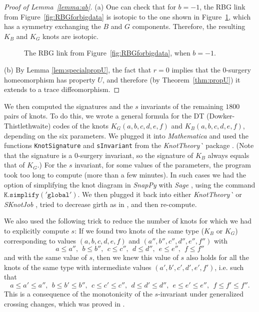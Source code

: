 \documentclass [11pt]{amsart}
\theoremstyle{remark}
\begin{document}
\begin{proof}[Proof of Lemma~\ref{lemma:ab}]
(a) One can check that for $b=-1$, the RBG link from Figure~\ref{fig:RBGforbigdata} is isotopic to the one shown in Figure~\ref{fig:bminus1}, which has a symmetry exchanging the $B$ and $G$ components. Therefore, the resulting $K_B$ and $K_G$ knots are isotopic. 
\begin{figure}
{
   \fontsize{9pt}{11pt}\selectfont 
   \def\svgwidth{2in}
   
}
\caption{The RBG link from Figure~\ref{fig:RBGforbigdata}, when $b=-1$. }
\label{fig:bminus1}
\end{figure}


(b) By Lemma \ref{lem:specialpropU}, the fact that $r=0$ implies that the 0-surgery homeomorphism has property $U$, and therefore (by Theorem~\ref{thm:propU}) it extends to a trace diffeomorphism. \end{proof}

We then computed the signatures and the $s$ invariants of the remaining $1800$ pairs of knots. To do this, we wrote a general formula for the DT (Dowker-Thistlethwaite) codes of the knots $K_G(a, b, c, d, e, f)$ and $K_B(a, b, c, d, e, f)$, depending on the six parameters. We plugged it into {\em Mathematica} \cite{mathematica} and used the functions {\tt KnotSignature} and {\tt sInvariant} from the \emph{KnotTheory\!\`{}} package \cite{KnotTheory}. (Note that the signature is a $0$-surgery invariant, so the signature of $K_B$ always equals that of $K_G$.) For the $s$ invariant, for some values of the parameters, the program took too long to compute (more than a few minutes). In such cases we had the option of simplifying the knot diagram in {\em SnapPy} with {\em Sage} \cite{SnapPy, Sage}, using the command $\mathtt{K.simplify('global')}$. We then plugged it back into either \emph{KnotTheory\!\`{}} or \emph{SKnotJob} \cite{SKnotJob}, tried to decrease girth as in \cite[Section 5.1]{FGMW}, and then re-compute. 

We also used the following trick to reduce the number of knots for which we had to explicitly compute $s$:
If we found two knots of the same type ($K_B$ or $K_G$) corresponding to values $(a, b, c, d, e, f)$ and $(a'', b'', c'', d'', e'', f'')$ with
$$ a \leq a'', \ \ b \leq b'', \ \ c\leq c'', \ \ d \leq d'' , \ \ e \leq e'', \ \  f \leq f''$$
and with the same value of $s$, then we knew this value of $s$ also holds for all the knots of the same type with intermediate values $(a', b', c', d', e', f')$, i.e. such that
$$ a \leq a' \leq a'', \ \ b \leq b' \leq b'', \ \ c\leq c' \leq c'', \ \ d \leq d'\leq d'' , \ \ e \leq e' \leq e'', \ \  f \leq f' \leq f''.$$
This is a consequence of the monotonicity of the $s$-invariant under generalized crossing changes, which was proved in \cite[Theorem 1.1]{MMSW}.
\end{document}
